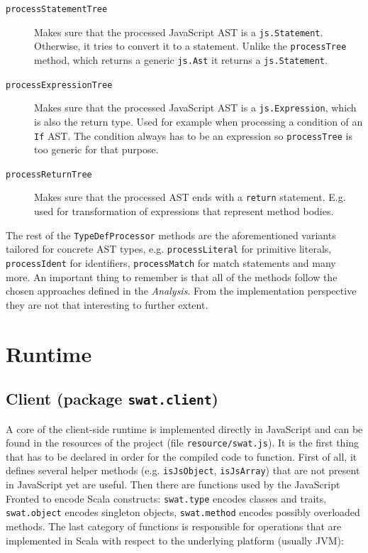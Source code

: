 \documentclass[12pt,a4paper]{report}
\begin{document}
\begin{description}
\item[\texttt{processStatementTree}] Makes sure that the processed JavaScript AST is a \texttt{js.Statement}. Otherwise, it tries to convert it to a statement. Unlike the \texttt{processTree} method, which returns a generic \texttt{js.Ast} it returns a \texttt{js.Statement}.
\item[\texttt{processExpressionTree}] Makes sure that the processed JavaScript AST is a \texttt{js.Expression}, which is also the return type. Used for example when processing a condition of an \texttt{If} AST. The condition always has to be an expression so \texttt{processTree} is too generic for that purpose.
\item[\texttt{processReturnTree}] Makes sure that the processed AST ends with a \texttt{return} statement. E.g. used for transformation of expressions that represent method bodies.
\end{description}

The rest of the \texttt{TypeDefProcessor} methods are the aforementioned variants tailored for concrete AST types, e.g. \texttt{processLiteral} for primitive literals, \texttt{processIdent} for identifiers, \texttt{processMatch} for match statements and many more. An important thing to remember is that all of the methods follow the chosen approaches defined in the {\it Analysis}. From the implementation perspective they are not that interesting to further extent.

\section{Runtime}

\subsection{Client (package \texttt{swat.client})}

A core of the client-side runtime is implemented directly in JavaScript and can be found in the resources of the project (file \texttt{resource/swat.js}). It is the first thing that has to be declared in order for the compiled code to function. First of all, it defines several helper methods (e.g. \texttt{isJsObject}, \texttt{isJsArray}) that are not present in JavaScript yet are useful. Then there are functions used by the JavaScript Fronted to encode Scala constructs: \texttt{swat.type} encodes classes and traits, \texttt{swat.object} encodes singleton objects, \texttt{swat.method} encodes possibly overloaded methods. The last category of functions is responsible for operations that are implemented in Scala with respect to the underlying platform (usually JVM):
\end{document}
